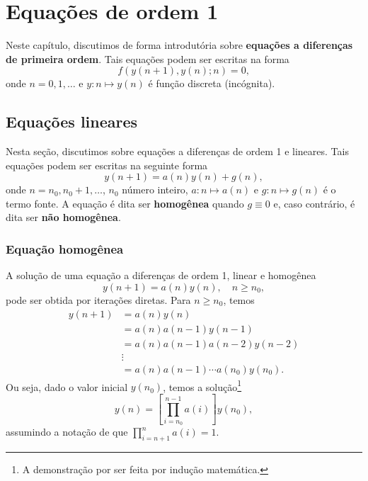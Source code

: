 
\chapter{Equações de ordem 1}\label{cap_ead1}

Neste capítulo, discutimos de forma introdutória sobre {\bf equações a diferenças de primeira ordem}. Tais equações podem ser escritas na forma
\begin{equation}
  f\left(y(n+1),y(n);n\right)=0,
\end{equation}
onde $n=0, 1, \ldots$ e $y:n\mapsto y(n)$ é função discreta (incógnita).

\section{Equações lineares}\label{cap_ead1_sec_eqlin}

Nesta seção, discutimos sobre equações a diferenças de ordem 1 e lineares. Tais equações podem ser escritas na seguinte forma
\begin{equation}
  y(n+1) = a(n)y(n) + g(n),
\end{equation}
onde $n=n_0, n_0+1, \ldots$, $n_0$ número inteiro, $a:n\mapsto a(n)$ e $g:n\mapsto g(n)$ é o termo fonte. A equação é dita ser {\bf homogênea} quando $g\equiv 0$ e, caso contrário, é dita ser {\bf não homogênea}.

\subsection{Equação homogênea}

A solução de uma equação a diferenças de ordem 1, linear e homogênea
\begin{equation}\label{eq:ead1_linear_eqh}
  y(n+1) = a(n)y(n),\quad n\geq n_0,
\end{equation}
pode ser obtida por iterações diretas. Para $n\geq n_0$, temos
\begin{align}
  y(n+1) &= a(n)y(n) \\
          &= a(n)a(n-1)y(n-1)\\
          &= a(n)a(n-1)a(n-2)y(n-2) \\
          &\vdots\\
          &= a(n)a(n-1)\cdots a(n_0)y(n_0).
\end{align}
Ou seja, dado o valor inicial $y(n_0)$, temos a solução\footnote{A demonstração por ser feita por indução matemática.}
\begin{equation}\label{eq:ead1_linear_eqh_sol}
  y(n) = \left[\prod_{i=n_0}^{n-1}a(i)\right]y(n_0),
\end{equation}
assumindo a notação de que $\prod_{i=n+1}^na(i)=1$.


